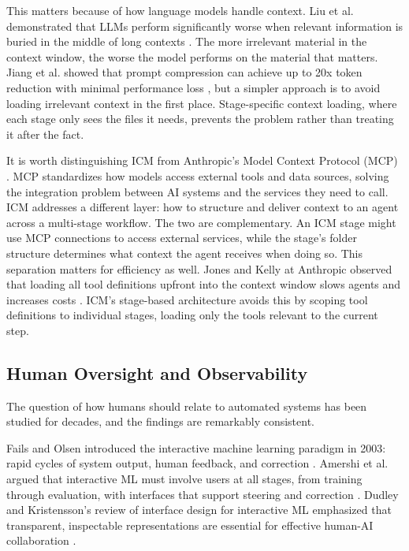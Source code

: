 \documentclass[acmlarge,nonacm,screen]{acmart}
\begin{document}
This matters because of how language models handle context. Liu et al. demonstrated that LLMs perform significantly worse when relevant information is buried in the middle of long contexts \cite{liu2024}. The more irrelevant material in the context window, the worse the model performs on the material that matters. Jiang et al. showed that prompt compression can achieve up to 20x token reduction with minimal performance loss \cite{jiang2023}, but a simpler approach is to avoid loading irrelevant context in the first place. Stage-specific context loading, where each stage only sees the files it needs, prevents the problem rather than treating it after the fact.

It is worth distinguishing ICM from Anthropic's Model Context Protocol (MCP) \cite{anthropic2024mcp}. MCP standardizes how models access external tools and data sources, solving the integration problem between AI systems and the services they need to call. ICM addresses a different layer: how to structure and deliver context to an agent across a multi-stage workflow. The two are complementary. An ICM stage might use MCP connections to access external services, while the stage's folder structure determines what context the agent receives when doing so. This separation matters for efficiency as well. Jones and Kelly at Anthropic observed that loading all tool definitions upfront into the context window slows agents and increases costs \cite{jones2025}. ICM's stage-based architecture avoids this by scoping tool definitions to individual stages, loading only the tools relevant to the current step.

\subsection{Human Oversight and Observability}

The question of how humans should relate to automated systems has been studied for decades, and the findings are remarkably consistent.

Fails and Olsen introduced the interactive machine learning paradigm in 2003: rapid cycles of system output, human feedback, and correction \cite{fails2003}. Amershi et al. argued that interactive ML must involve users at all stages, from training through evaluation, with interfaces that support steering and correction \cite{amershi2014}. Dudley and Kristensson's review of interface design for interactive ML emphasized that transparent, inspectable representations are essential for effective human-AI collaboration \cite{dudley2018}.
\end{document}
